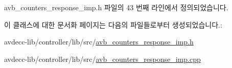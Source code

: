 avb\+\_\+counters\+\_\+response\+\_\+imp.\+h 파일의 43 번째 라인에서 정의되었습니다.



이 클래스에 대한 문서화 페이지는 다음의 파일들로부터 생성되었습니다.\+:\begin{DoxyCompactItemize}
\item 
avdecc-\/lib/controller/lib/src/\hyperlink{avb__counters__response__imp_8h}{avb\+\_\+counters\+\_\+response\+\_\+imp.\+h}\item 
avdecc-\/lib/controller/lib/src/\hyperlink{avb__counters__response__imp_8cpp}{avb\+\_\+counters\+\_\+response\+\_\+imp.\+cpp}\end{DoxyCompactItemize}
